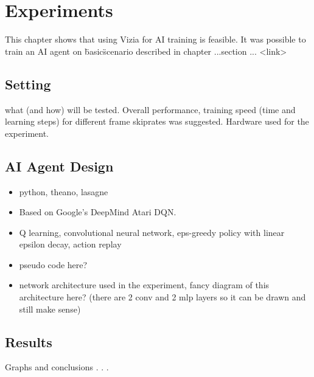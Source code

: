 \chapter{Experiments}
This chapter shows that using Vizia for AI training is feasible. It was possible to train an AI agent on \"basic\" scenario described in chapter ...section ... <link> 

\section{Setting} 
what (and how) will be tested. Overall performance, training speed (time and learning steps) for different frame skiprates was suggested.
Hardware used for the experiment.

\section{AI Agent Design}
\begin{itemize}
\item python, theano, lasagne
\item Based on Google's DeepMind Atari DQN.
\item Q learning, convolutional neural network, eps-greedy policy with linear epsilon decay, action replay
\item pseudo code here?
\item network architecture used in the experiment, fancy diagram of this architecture here? (there are 2 conv and 2 mlp layers so it can be drawn and still make sense)
\end{itemize}


\section{Results}
Graphs and conclusions . . .